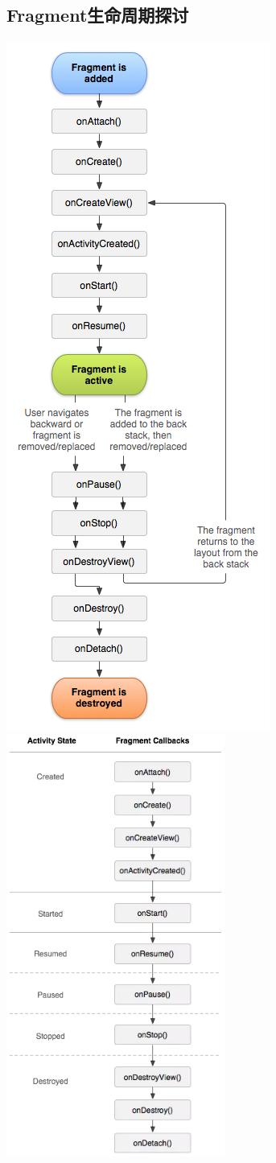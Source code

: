 \documentclass[9pt, b5paper]{article}
\begin{document}
\subsection{Fragment生命周期探讨}
\label{sec-1-2}
\includegraphics[width=.4\linewidth]{./pic/fragmentlifecycle.png}
\includegraphics[width=.4\linewidth]{./pic/lifecyclecompare.png}
\end{document}

